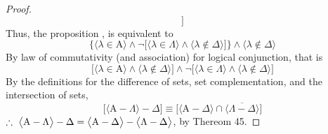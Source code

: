 \documentclass[preview]{standalone}
\begin{document}
\begin{proof}
\begin{equation*}
        \bigg]
    \end{equation*}
    Thus, the proposition
    ,
    is equivalent to
    \begin{equation*}
        \Bigg\{
        \Big \langle \lambda \in \mathrm{A} \Big \rangle
            \land
        \lnot \bigg[
            \Big \langle \lambda \in \Lambda \Big \rangle
                \land
            \Big \langle \lambda \notin \Delta \Big \rangle
        \bigg]
        \Bigg\}
            \land
        \Big \langle \lambda \notin \Delta \Big \rangle
    \end{equation*}
    By law of commutativity (and association) for logical conjunction, 
    that is
    \begin{equation*}
        \bigg[
            \Big \langle \lambda \in \mathrm{A} \Big \rangle
                \land
            \Big \langle \lambda \notin \Delta \Big \rangle
        \bigg]
            \land
        \lnot \bigg[
            \Big \langle \lambda \in \Lambda \Big \rangle
                \land
            \Big \langle \lambda \notin \Delta \Big \rangle
        \bigg]
    \end{equation*}
    By the definitions for the difference of sets, set complementation,
    and the intersection of sets,
    \begin{equation*}
        \bigg[
        \Big \langle \mathrm{A} - \Lambda \Big \rangle - \Delta
        \bigg]
            \equiv
        \bigg[
        \Big \langle \mathrm{A} - \Delta \Big \rangle
            \cap
        \overline{
            \Big \langle \Lambda - \Delta \Big \rangle
        }
        \bigg]
    \end{equation*}
    $\therefore \text{\space} \relax{
    \big \langle \mathrm{A} - \Lambda \big \rangle - \Delta 
        = 
    \big \langle \mathrm{A} - \Delta \big \rangle 
        - 
    \big \langle \Lambda - \Delta \big \rangle
    }$, by Thereom 45.

\end{proof}
\end{document}
